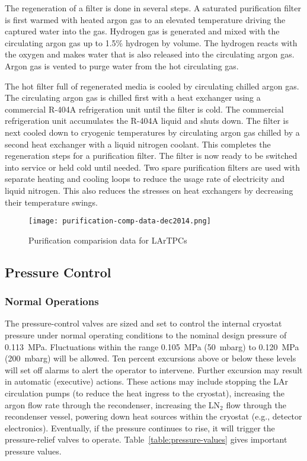 The regeneration of a filter is done in several steps. A saturated purification filter is first warmed with heated argon gas to an elevated temperature driving the captured water into the gas. Hydrogen gas is generated and mixed with the circulating argon gas up to 1.5\% hydrogen by volume. The hydrogen reacts with the oxygen and makes water that is also released into the circulating argon gas.
Argon gas is vented to purge water from the hot circulating gas. 

The hot filter full of regenerated media is cooled by circulating chilled argon gas. The circulating argon gas is chilled first with a heat exchanger using a commercial R-404A refrigeration unit until the filter is cold. The commercial refrigeration unit accumulates the R-404A liquid and shuts down. The filter is next cooled down to cryogenic temperatures by circulating argon gas chilled by a second heat exchanger with a liquid nitrogen coolant. This completes the regeneration steps for a purification filter. The filter is now ready to be switched into service or held cold until needed. Two spare purification filters are used with separate heating and cooling loops to reduce the usage rate of electricity and liquid nitrogen. This also reduces the stresses on heat exchangers by decreasing their temperature swings.


\begin{figure}[htbp]
\centering
\texttt{[image: purification-comp-data-dec2014.png]}
\caption{Purification comparision data for LArTPCs}
\label{fig:table:purif-compare}
\end{figure}

\subsection{Pressure Control}
\label{sec:press-control}

\subsubsection{Normal Operations}

The pressure-control valves are sized and set to control the internal cryostat pressure under normal operating conditions to the nominal design pressure of 0.113~MPa.  Fluctuations within the range 0.105~MPa (50~mbarg) to 0.120~MPa (200~mbarg) will be allowed.
Ten percent excursions above or below these levels will set off alarms to alert the operator to 
intervene.  Further excursion may result in automatic (executive) actions.  These actions may 
include stopping the LAr circulation pumps (to reduce the heat ingress to the cryostat), increasing the 
argon flow rate through the recondenser, increasing the LN$_2$ flow through the recondenser vessel, 
powering down heat sources within the cryostat (e.g., detector electronics).  Eventually, if the pressure continues to rise, it will trigger the pressure-relief valves to operate. Table~\ref{table:pressure-values} gives important pressure values.

